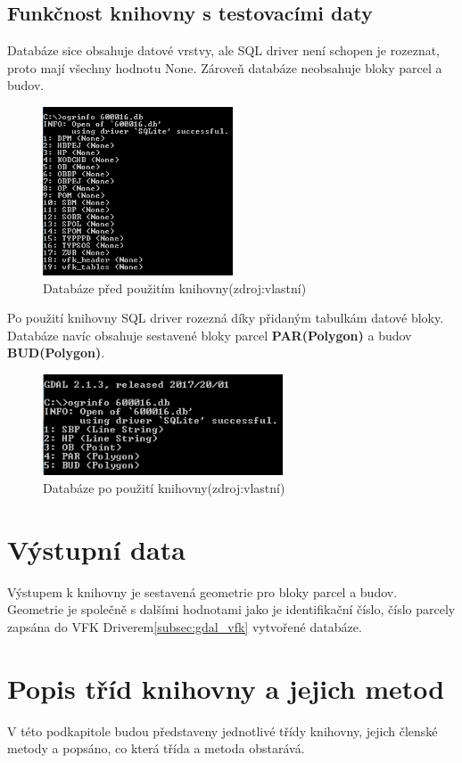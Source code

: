 \subsection{Funkčnost knihovny s testovacími daty}
Databáze sice obsahuje datové vrstvy, ale SQL driver není schopen je rozeznat, proto mají všechny hodnotu None. Zároveň databáze neobsahuje bloky parcel a budov.
\begin{figure}[H]
	 \centering
      \includegraphics[height=5cm]{./pictures/funkcnost_knihovny_pred.png}
      \caption{Databáze před použitím knihovny(zdroj:vlastní)}
      \label{fig:funkcnost_pred}
\end{figure}
Po použití knihovny SQL driver rozezná díky přidaným tabulkám datové bloky. Databáze navíc obsahuje sestavené bloky parcel \textbf{PAR(Polygon)} a budov \textbf{BUD(Polygon)}. 
\begin{figure}[H]
	 \centering
     \includegraphics[height=3cm]{./pictures/funkcnost_knihovny_po.png}
     \caption{Databáze po použití knihovny(zdroj:vlastní)}
     \label{fig:funkcnost_po}
\end{figure}  
  
\section{Výstupní data}
Výstupem k knihovny je sestavená geometrie pro bloky parcel a budov. Geometrie je společně s dalšími hodnotami jako je identifikační číslo, číslo parcely zapsána do VFK Driverem\ref{subsec:gdal_vfk} vytvořené databáze.

\section{Popis tříd knihovny a jejich metod}
V této podkapitole budou představeny jednotlivé třídy knihovny, jejich členské metody a popsáno, co která třída a metoda obstarává.

